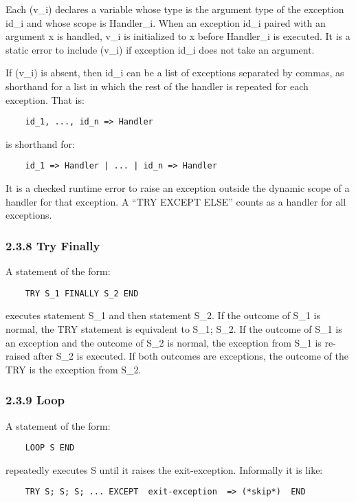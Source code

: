 \documentclass[10pt]{article}
\begin{document}
 Each (v\_i) declares a variable whose type is the argument type of the exception id\_i and whose scope is Handler\_i. When an exception id\_i paired with an argument x is handled, v\_i is initialized to x before Handler\_i is executed. It is a static error to include (v\_i) if exception id\_i does not take an argument. 


  If (v\_i) is absent, then id\_i can be a list of exceptions separated by commas, as shorthand for a list in which the rest of the handler is repeated for each exception. That is: 
\begin{verbatim}
    id_1, ..., id_n => Handler
\end{verbatim}
 is shorthand for: 
\begin{verbatim}
    id_1 => Handler | ... | id_n => Handler
\end{verbatim}



 It is a checked runtime error to raise an exception outside the dynamic scope of a handler for that exception. A ``TRY EXCEPT ELSE'' counts as a handler for all exceptions. 


 
\subsubsection*{2.3.8 Try Finally}


  A statement of the form: 
\begin{verbatim}
    TRY S_1 FINALLY S_2 END
\end{verbatim}
 executes statement S\_1 and then statement S\_2. If the outcome of S\_1 is normal, the TRY statement is equivalent to S\_1; S\_2. If the outcome of  S\_1 is an exception and the outcome of S\_2 is normal, the exception from S\_1 is re-raised after S\_2 is executed. If both outcomes are exceptions, the outcome of the TRY is the exception from S\_2. 


 
\subsubsection*{2.3.9 Loop}


  A statement of the form: 
\begin{verbatim}
    LOOP S END
\end{verbatim}
 repeatedly executes S until it raises the exit-exception. Informally it is like: 
\begin{verbatim}
    TRY S; S; S; ... EXCEPT  exit-exception  => (*skip*)  END
\end{verbatim}
\end{document}
